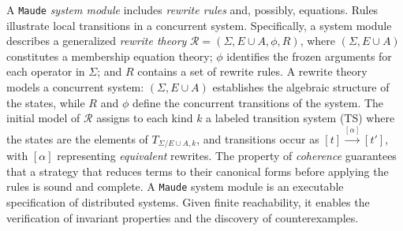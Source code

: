 A \texttt{Maude} \emph{system module} includes \emph{rewrite rules} and, possibly, equations. Rules illustrate local transitions in a concurrent system. Specifically, a system module describes a generalized \emph{rewrite theory} \cite{rewlog03} $\mathcal{R}= (\Sigma,E \cup A,\phi,R)$, where $(\Sigma,E \cup A)$ constitutes a membership equation theory; $\phi$ identifies the frozen arguments for each operator in $\Sigma$; and $R$ contains a set of rewrite rules. 
A rewrite theory models a concurrent system: $(\Sigma,E \cup A)$ establishes the algebraic structure of the states, while $R$ and $\phi$ define the concurrent transitions of the system. The initial model of $\mathcal{R}$ assigns to each kind $k$ a labeled transition system (TS) where the states are the elements of $T_{\Sigma /E \cup A,k}$, and transitions occur as $ [t] \overset{[\alpha] }{\rightarrow} [t']$, with $[\alpha]$ representing \emph{equivalent} rewrites. The property of \emph{coherence} guarantees that a strategy that reduces terms to their canonical forms before applying the rules is sound and complete. A \texttt{Maude} system module is an executable specification of distributed systems. Given finite reachability, it enables the verification of invariant properties and the discovery of counterexamples.
